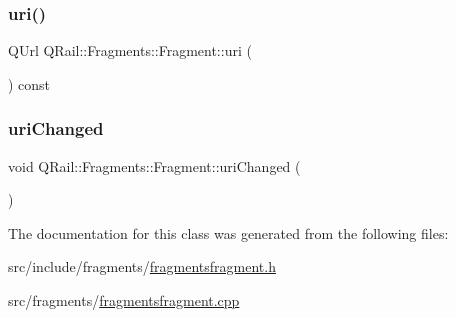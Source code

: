 \subsubsection{\texorpdfstring{uri()}{uri()}}
{\footnotesize\ttfamily Q\+Url Q\+Rail\+::\+Fragments\+::\+Fragment\+::uri (\begin{DoxyParamCaption}{ }\end{DoxyParamCaption}) const}

\mbox{\label{classQRail_1_1Fragments_1_1Fragment_aef96a29b0a9babac79b1705be6d89346}} 
\subsubsection{\texorpdfstring{uriChanged}{uriChanged}}
{\footnotesize\ttfamily void Q\+Rail\+::\+Fragments\+::\+Fragment\+::uri\+Changed (\begin{DoxyParamCaption}{ }\end{DoxyParamCaption})\hspace{0.3cm}{\ttfamily [signal]}}



The documentation for this class was generated from the following files\+:\begin{DoxyCompactItemize}
\item 
src/include/fragments/\mbox{\hyperlink{fragmentsfragment_8h}{fragmentsfragment.\+h}}\item 
src/fragments/\mbox{\hyperlink{fragmentsfragment_8cpp}{fragmentsfragment.\+cpp}}\end{DoxyCompactItemize}
